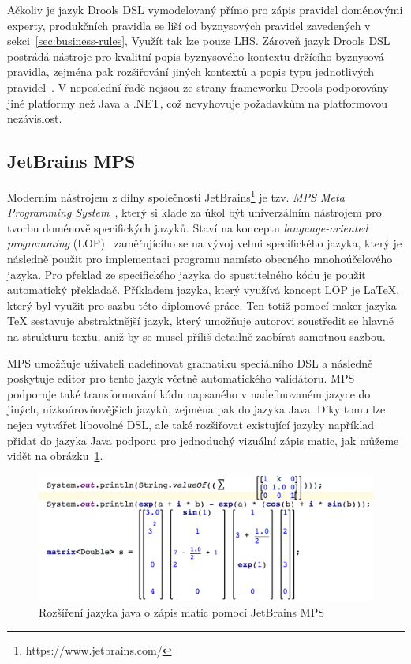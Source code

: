Ačkoliv je jazyk Drools \gls{DSL} vymodelovaný přímo pro zápis pravidel doménovými experty,
produkčních pravidla se liší od byznysových pravidel zavedených v sekci~\ref{sec:business-rules},
Využít tak lze pouze \gls{LHS}. Zároveň jazyk Drools \gls{DSL} postrádá
nástroje pro kvalitní popis byznysového kontextu držícího byznysová pravidla,
zejména pak rozšiřování jiných kontextů a popis typu jednotlivých pravidel~\cite{cemus2017automated}.
V neposlední řadě nejsou ze strany frameworku Drools podporovány jiné platformy než
Java a .NET, což nevyhovuje požadavkům na platformovou nezávislost.

\subsection{JetBrains MPS}

Moderním nástrojem z dílny společnosti JetBrains\footnote{https://www.jetbrains.com/}
je tzv. \textit{MPS \textendash\xspace Meta Programming System}~\cite{jetbrainsmps}, který si klade za úkol být univerzálním
nástrojem pro tvorbu doménově specifických jazyků. Staví na konceptu \textit{language-oriented
programming} (\gls{LOP})~\cite{ward1994language} zaměřujícího se na vývoj velmi specifického jazyka,
který je následně použit pro implementaci programu namísto obecného mnohoúčelového jazyka. Pro překlad
ze specifického jazyka do spustitelného kódu je použit automatický překladač. Příkladem jazyka, který využívá koncept \gls{LOP}
je \LaTeX\xspace, který byl využit pro sazbu této diplomové práce. Ten totiž pomocí maker jazyka \TeX\xspace
sestavuje abstraktnější jazyk, který umožňuje autorovi soustředit se hlavně na strukturu textu, aniž by
se musel příliš detailně zaobírat samotnou sazbou.

MPS umožňuje uživateli nadefinovat gramatiku speciálního \gls{DSL} a následně poskytuje
editor pro tento jazyk včetně automatického validátoru. MPS podporuje také transformování kódu napsaného
v nadefinovaném jazyce do jiných, nízkoúrovňovějších jazyků, zejména pak do jazyka Java.
Díky tomu lze nejen vytvářet libovolné \gls{DSL}, ale také rozšiřovat existující
jazyky \textendash\xspace například přidat do jazyka Java podporu pro jednoduchý vizuální
zápis matic, jak můžeme vidět na obrázku~\ref{fig:java-matrix}.

\begin{figure}[t]
    \centering
    \includegraphics[keepaspectratio=true, width=0.7\linewidth]{figures/java-matrix.png}
    \caption{Rozšíření jazyka java o zápis matic pomocí JetBrains MPS~\cite{jetbrainsmps}}
    \label{fig:java-matrix}
\end{figure}

